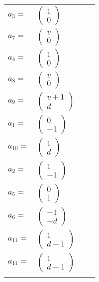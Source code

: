 \documentclass[1p]{elsarticle_modified}
\theoremstyle{definition}
\begin{document}
\begin{tabular}{m{7pt} m{180pt} m{7pt} m{180pt} }
\flushright $a_{3}=$&$\begin{pmatrix}1\\0\end{pmatrix}$ \\
\flushright $a_{7}=$&$\begin{pmatrix}v\\0\end{pmatrix}$ \\
\flushright $a_{4}=$&$\begin{pmatrix}1\\0\end{pmatrix}$ \\
\flushright $a_{8}=$&$\begin{pmatrix}v\\0\end{pmatrix}$ \\
\flushright $a_{9}=$&$\begin{pmatrix}v+1\\d\end{pmatrix}$ \\
\flushright $a_{1}=$&$\begin{pmatrix}0\\-1\end{pmatrix}$ \\
\flushright $a_{10}=$&$\begin{pmatrix}1\\d\end{pmatrix}$ \\
\flushright $a_{2}=$&$\begin{pmatrix}1\\-1\end{pmatrix}$ \\
\flushright $a_{5}=$&$\begin{pmatrix}0\\1\end{pmatrix}$ \\
\flushright $a_{6}=$&$\begin{pmatrix}-1\\- d\end{pmatrix}$ \\
\flushright $a_{11}=$&$\begin{pmatrix}1\\d-1\end{pmatrix}$\\ \flushright $a_{11}=$&$\begin{pmatrix}1\\d-1\end{pmatrix}$\\&\end{tabular}
\end{document}
